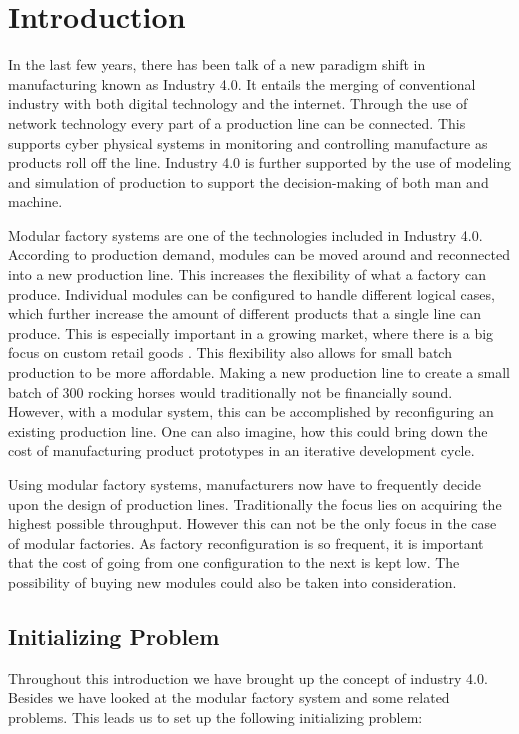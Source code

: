 \chapter{Introduction}
\label{ch:introduction}

In the last few years, there has been talk of a new paradigm shift in manufacturing known as Industry 4.0. It entails the merging of conventional industry with both digital technology and the internet. Through the use of network technology every part of a production line can be connected. This supports cyber physical systems in monitoring and controlling manufacture as products roll off the line. Industry 4.0 is further supported by the use of modeling and simulation of production to support the decision-making of both man and machine. \cite{Davis2015}

Modular factory systems are one of the technologies included in Industry 4.0. According to production demand, modules can be moved around and reconnected into a new production line. This increases the flexibility of what a factory can produce. Individual modules can be configured to handle different logical cases, which further increase the amount of different products that a single line can produce. This is especially important in a growing market, where there is a big focus on custom retail goods \cite{Spaulding2013}.  This flexibility also allows for small batch production to be more affordable.  Making a new production line to create a small batch of 300 rocking horses would traditionally not be financially sound. However, with a modular system, this can be accomplished by reconfiguring an existing production line. One can also imagine, how this could bring down the cost of manufacturing product prototypes in an iterative development cycle.

Using modular factory systems, manufacturers now have to frequently decide upon the design of production lines. Traditionally the focus lies on acquiring the highest possible throughput. However this can not be the only focus in the case of modular factories. As factory reconfiguration is so frequent, it is important that the cost of going from one configuration to the next is kept low. The possibility of buying new modules could also be taken into consideration. 

\section{Initializing Problem}

Throughout this introduction we have brought up the concept of industry 4.0. Besides we have looked at the modular factory system and some related problems. This leads us to set up the following initializing problem:

